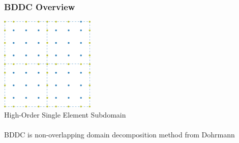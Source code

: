\documentclass{beamer}
\begin{document}
\begin{frame}
\begin{center}
\frametitle{BDDC Overview}

\includegraphics[height=4.5cm]{../img/HighOrderBDDCMeshInterface}\\
{\small High-Order Single Element Subdomain}\\

~\\

BDDC is non-overlapping domain decomposition method from Dohrmann \cite{dohrmann2003preconditioner}

\end{center}
\end{frame}

\end{document}
